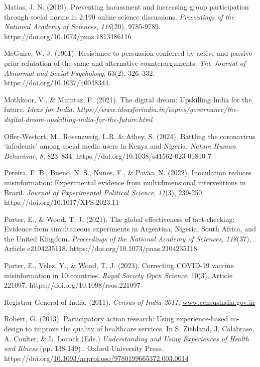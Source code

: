 \documentclass[authordate, empirical]{jote-new-article}
\begin{document}
	Matias, J. N. (2019). Preventing harassment and increasing group participation through social norms in 2,190 online science discussions. \emph{Proceedings of the National Academy of Sciences}, \emph{116}(20), 9785-9789. https://doi.org/10.1073/pnas.1813486116



	McGuire, W. J. (1961). Resistance to persuasion conferred by active and passive prior refutation of the same and alternative counterarguments. \emph{The Journal of Abnormal and Social Psychology}, 63(2), 326--332. https://doi.org/10.1037/h0048344.



	Mothkoor, V., \& Mumtaz, F. (2021). The digital dream: Upskilling India for the future. \emph{Ideas for India. https://www.ideasforindia.in/topics/governance/the-digital-dream-upskilling-india-for-the-future.html}



	Offer-Westort, M., Rosenzweig, L.R. \& Athey, S. (2024). Battling the coronavirus ‘infodemic' among social media users in Kenya and Nigeria. \emph{Nature Human Behaviour}, \emph{8}, 823--834. https://doi.org/10.1038/s41562-023-01810-7



	Pereira, F. B., Bueno, N. S., Nunes, F., \& Pavão, N. (2022). Inoculation reduces misinformation: Experimental evidence from multidimensional interventions in Brazil. \emph{Journal of Experimental Political Science}, \emph{11}(3), 239-250. https://doi.org/10.1017/XPS.2023.11



	Porter, E., \& Wood, T. J. (2021). The global effectiveness of fact-checking: Evidence from simultaneous experiments in Argentina, Nigeria, South Africa, and the United Kingdom. \emph{Proceedings of the National Academy of Sciences}, \emph{118}(37), Article e2104235118. https://doi.org/10.1073/pnas.2104235118



	Porter, E., Velez, Y., \& Wood, T. J. (2023). Correcting COVID-19 vaccine misinformation in 10 countries. \emph{Royal Society Open Science}, 10(3), Article 221097. https://doi.org/10.1098/rsos.221097



	Registrar General of India. (2011). \emph{Census of India 2011}. \href{http://www.censusindia.gov.in}{\underline{www.censusindia.gov.in}}



	Robert, G. (2013). Participatory action research: Using experience-based co-design to improve the quality of healthcare services. In S. Ziebland, J. Calabrase, A. Coulter, \& L. Locock (Eds.) \emph{Understanding and Using Experiences of Health and Illness }(pp. 138-149)\emph{.}. Oxford University Press. https://doi.org/\href{http://dx.doi.org/10.1093/acprof:oso/9780199665372.003.0014}{10.1093/acprof:oso/9780199665372.003.0014}
\end{document}
